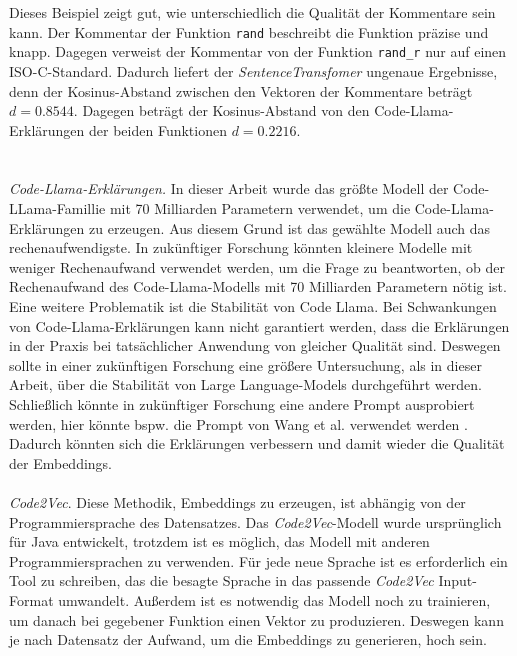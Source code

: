 \documentclass[12pt,letterpaper,ngerman]{article}
\begin{document}
Dieses Beispiel zeigt gut, wie unterschiedlich die Qualität 
der Kommentare sein kann. Der Kommentar der Funktion \texttt{rand}
beschreibt die Funktion präzise und knapp. Dagegen verweist der 
Kommentar von der Funktion \texttt{rand\_r} nur auf einen 
ISO-C-Standard. Dadurch liefert der \textit{SentenceTransfomer}
ungenaue Ergebnisse, denn der Kosinus-Abstand zwischen
den Vektoren der Kommentare beträgt $d = 0.8544$.
Dagegen beträgt der Kosinus-Abstand von den Code-Llama-Erklärungen
der beiden Funktionen $d = 0.2216$.\\
\hfill\\
\pagebreak
\hfill\\
\textit{Code-Llama-Erklärungen.}
In dieser Arbeit wurde das größte Modell der Code-LLama-Famillie 
mit 70 Milliarden Parametern verwendet, um die 
Code-Llama-Erklärungen zu erzeugen. Aus diesem Grund ist das
gewählte Modell auch das rechenaufwendigste. In zukünftiger 
Forschung könnten kleinere Modelle mit weniger Rechenaufwand 
verwendet werden, um die Frage zu beantworten, ob der Rechenaufwand 
des Code-Llama-Modells mit 70 Milliarden Parametern nötig ist. \\
Eine weitere Problematik ist die Stabilität von Code Llama.
Bei Schwankungen von Code-Llama-Erklärungen kann nicht garantiert 
werden, dass die Erklärungen in der Praxis bei tatsächlicher 
Anwendung von gleicher Qualität sind. Deswegen sollte in
einer zukünftigen Forschung eine größere Untersuchung, 
als in dieser Arbeit, über die Stabilität von Large 
Language-Models durchgeführt werden.\\ 
Schließlich könnte in zukünftiger Forschung eine andere 
Prompt ausprobiert werden, hier könnte bspw. die 
Prompt von Wang et al. verwendet werden 
\cite{clap}. Dadurch könnten sich die Erklärungen 
verbessern und damit wieder die Qualität der 
Embeddings.\\\\
\textit{Code2Vec}. 
Diese Methodik, Embeddings zu erzeugen,
ist abhängig von der Programmiersprache des Datensatzes.  
Das \textit{Code2Vec}-Modell wurde ursprünglich für Java entwickelt,
trotzdem ist es möglich, das Modell mit anderen Programmiersprachen
zu verwenden. Für jede neue Sprache ist es erforderlich ein
Tool zu schreiben, das die besagte Sprache in das passende 
\textit{Code2Vec} Input-Format umwandelt. Außerdem ist es 
notwendig das Modell noch zu trainieren, um danach bei 
gegebener Funktion einen Vektor zu produzieren. Deswegen 
kann je nach Datensatz der Aufwand,
um die Embeddings zu generieren, hoch sein. \\
\end{document}
